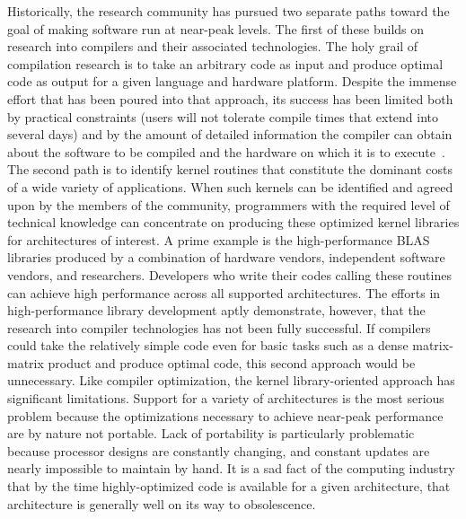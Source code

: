 \documentclass[11pt]{article}
\begin{document}
Historically, the research community has pursued two separate paths toward the goal of making software run at near-peak levels.  The first of these builds on research into compilers and their associated technologies.  The holy grail of compilation research is to take an arbitrary code as input and produce optimal code as output for a given language and hardware platform.  Despite the immense effort that has been poured into that approach, its success has been limited both by practical constraints (users will not tolerate compile times that extend into several days) and by the amount of detailed information the compiler can obtain about the software to be compiled and the hardware on which it is to execute~\cite{Ken99,Wol89,Wol96}.  The second path is to identify kernel routines that constitute the dominant costs of a wide variety of applications.  When such kernels can be identified and agreed upon by the members of the community, programmers with the required level of technical knowledge can concentrate on producing these optimized kernel libraries for architectures of interest. A prime example is the high-performance BLAS libraries produced by a combination of hardware vendors, independent software vendors, and researchers.  Developers who write their codes calling these routines can achieve high performance across all supported architectures. The efforts in high-performance library development aptly demonstrate, however, that the research into compiler technologies has not been fully successful.  If compilers could take the relatively simple code even for basic tasks such as a dense matrix-matrix product and produce optimal code, this second approach would be unnecessary.    Like compiler optimization, the kernel library-oriented approach has significant limitations.  Support for a variety of architectures is the most serious problem because the optimizations necessary to achieve near-peak performance are by nature not portable.   Lack of portability is particularly problematic because processor designs are constantly changing,  and constant updates are nearly impossible to maintain by hand.  It is a sad fact of the computing industry that by the time highly-optimized code is available for a given architecture, that architecture is generally well on its way to obsolescence.   
\end{document}
